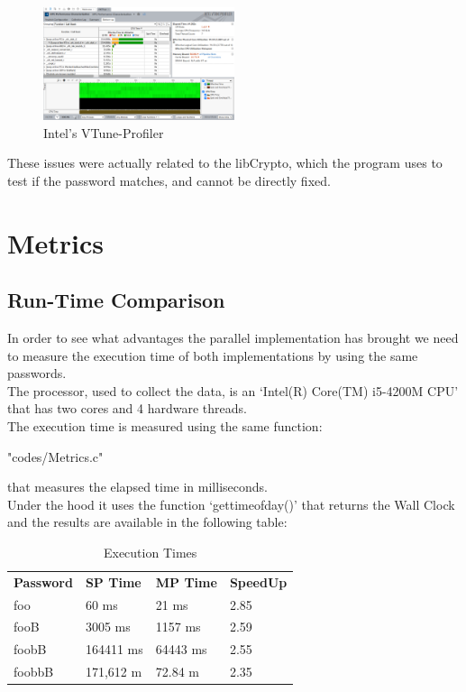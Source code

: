 \documentclass[10pt,twocolumn,letterpaper]{article}
\begin{document}
\begin{figure}[H]
\centering
\includegraphics[width=0.5\textwidth]{vtune_profiler}
\caption{Intel's VTune-Profiler}
\end{figure}
These issues were actually related to the libCrypto, which the program uses to test if the password matches, and cannot be directly 
fixed.
\section{Metrics}
\subsection{Run-Time Comparison}
In order to see what advantages the parallel implementation has brought we need to measure the execution time of both implementations by
using the same passwords.\\
The processor, used to collect the data, is an `Intel(R) Core(TM) i5-4200M CPU' that has two cores and 4 hardware threads.\\
The execution time is measured using the same function:\\
\begin{lstinputlisting}[language=C,style=CSnippetStyle,caption=Time Function,firstline=1,lastline=13]
		{"codes/Metrics.c"}
\end{lstinputlisting}
that measures the elapsed time in milliseconds.\\
Under the hood it uses the function `gettimeofday()' that returns the Wall Clock and the results are available in the following table:
\\
\begin{table}[H]
 \begin{tabularx}{\columnwidth}{X|X|X|X|}
\textbf{Password} & \textbf{SP Time} & \textbf{MP Time} &  \textbf{SpeedUp} \\
foo & 60 ms & 21 ms & 2.85 \\
fooB & 3005 ms & 1157 ms & 2.59 \\
foobB & 164411 ms & 64443 ms & 2.55 \\
foobbB & 171,612 m & 72.84 m & 2.35 \\
\end{tabularx}
\caption{Execution Times}
\end{table}
\end{document}

